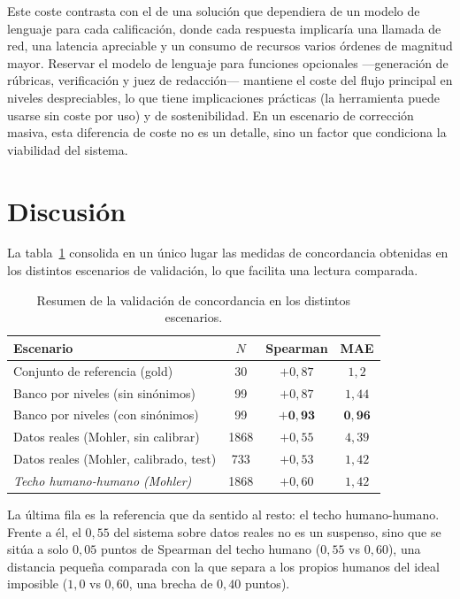 Este coste contrasta con el de una solución que dependiera de un modelo de lenguaje para cada calificación, donde cada respuesta implicaría una llamada de red, una latencia apreciable y un consumo de recursos varios órdenes de magnitud mayor. Reservar el modelo de lenguaje para funciones opcionales —generación de rúbricas, verificación y juez de redacción— mantiene el coste del flujo principal en niveles despreciables, lo que tiene implicaciones prácticas (la herramienta puede usarse sin coste por uso) y de sostenibilidad. En un escenario de corrección masiva, esta diferencia de coste no es un detalle, sino un factor que condiciona la viabilidad del sistema.

\section{Discusión}

La tabla~\ref{tab:resumen} consolida en un único lugar las medidas de concordancia obtenidas en los distintos escenarios de validación, lo que facilita una lectura comparada.

\begin{table}[ht]
\centering
\caption{Resumen de la validación de concordancia en los distintos escenarios.}
\label{tab:resumen}
\small
\begin{tabularx}{\textwidth}{>{\raggedright\arraybackslash}X c c c}
\toprule
Escenario & $N$ & Spearman & MAE \\
\midrule
Conjunto de referencia (gold) & 30 & $+0{,}87$ & $1{,}2$ \\
Banco por niveles (sin sinónimos) & 99 & $+0{,}87$ & $1{,}44$ \\
Banco por niveles (con sinónimos) & 99 & $\mathbf{+0{,}93}$ & $\mathbf{0{,}96}$ \\
Datos reales (Mohler, sin calibrar) & 1868 & $+0{,}55$ & $4{,}39$ \\
Datos reales (Mohler, calibrado, test) & 733 & $+0{,}53$ & $1{,}42$ \\
\textit{Techo humano-humano (Mohler)} & 1868 & \textit{$+0{,}60$} & \textit{$1{,}42$} \\
\bottomrule
\end{tabularx}
\end{table}

La última fila es la referencia que da sentido al resto: el techo humano-humano. Frente a él, el $0{,}55$ del sistema sobre datos reales no es un suspenso, sino que se sitúa a solo $0{,}05$ puntos de Spearman del techo humano ($0{,}55$ vs $0{,}60$), una distancia pequeña comparada con la que separa a los propios humanos del ideal imposible ($1{,}0$ vs $0{,}60$, una brecha de $0{,}40$ puntos).

